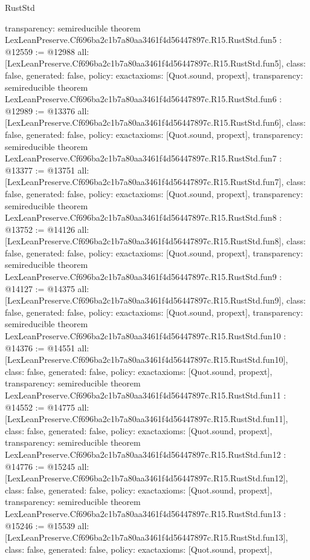 \begin{lexlean}{RustStd}
\begin{coremodule}
{  transparency: semireducible
}
theorem LexLeanPreserve.Cf696ba2c1b7a80aa3461f4d56447897c.R15.RustStd.fun5 : @12559 := @12988 {
  all: [LexLeanPreserve.Cf696ba2c1b7a80aa3461f4d56447897c.R15.RustStd.fun5],
  class: false,
  generated: false,
  policy: exact{axioms: [Quot.sound, propext]},
  transparency: semireducible
}
theorem LexLeanPreserve.Cf696ba2c1b7a80aa3461f4d56447897c.R15.RustStd.fun6 : @12989 := @13376 {
  all: [LexLeanPreserve.Cf696ba2c1b7a80aa3461f4d56447897c.R15.RustStd.fun6],
  class: false,
  generated: false,
  policy: exact{axioms: [Quot.sound, propext]},
  transparency: semireducible
}
theorem LexLeanPreserve.Cf696ba2c1b7a80aa3461f4d56447897c.R15.RustStd.fun7 : @13377 := @13751 {
  all: [LexLeanPreserve.Cf696ba2c1b7a80aa3461f4d56447897c.R15.RustStd.fun7],
  class: false,
  generated: false,
  policy: exact{axioms: [Quot.sound, propext]},
  transparency: semireducible
}
theorem LexLeanPreserve.Cf696ba2c1b7a80aa3461f4d56447897c.R15.RustStd.fun8 : @13752 := @14126 {
  all: [LexLeanPreserve.Cf696ba2c1b7a80aa3461f4d56447897c.R15.RustStd.fun8],
  class: false,
  generated: false,
  policy: exact{axioms: [Quot.sound, propext]},
  transparency: semireducible
}
theorem LexLeanPreserve.Cf696ba2c1b7a80aa3461f4d56447897c.R15.RustStd.fun9 : @14127 := @14375 {
  all: [LexLeanPreserve.Cf696ba2c1b7a80aa3461f4d56447897c.R15.RustStd.fun9],
  class: false,
  generated: false,
  policy: exact{axioms: [Quot.sound, propext]},
  transparency: semireducible
}
theorem LexLeanPreserve.Cf696ba2c1b7a80aa3461f4d56447897c.R15.RustStd.fun10 : @14376 := @14551 {
  all: [LexLeanPreserve.Cf696ba2c1b7a80aa3461f4d56447897c.R15.RustStd.fun10],
  class: false,
  generated: false,
  policy: exact{axioms: [Quot.sound, propext]},
  transparency: semireducible
}
theorem LexLeanPreserve.Cf696ba2c1b7a80aa3461f4d56447897c.R15.RustStd.fun11 : @14552 := @14775 {
  all: [LexLeanPreserve.Cf696ba2c1b7a80aa3461f4d56447897c.R15.RustStd.fun11],
  class: false,
  generated: false,
  policy: exact{axioms: [Quot.sound, propext]},
  transparency: semireducible
}
theorem LexLeanPreserve.Cf696ba2c1b7a80aa3461f4d56447897c.R15.RustStd.fun12 : @14776 := @15245 {
  all: [LexLeanPreserve.Cf696ba2c1b7a80aa3461f4d56447897c.R15.RustStd.fun12],
  class: false,
  generated: false,
  policy: exact{axioms: [Quot.sound, propext]},
  transparency: semireducible
}
theorem LexLeanPreserve.Cf696ba2c1b7a80aa3461f4d56447897c.R15.RustStd.fun13 : @15246 := @15539 {
  all: [LexLeanPreserve.Cf696ba2c1b7a80aa3461f4d56447897c.R15.RustStd.fun13],
  class: false,
  generated: false,
  policy: exact{axioms: [Quot.sound, propext]},
}
\end{coremodule}
\end{lexlean}
